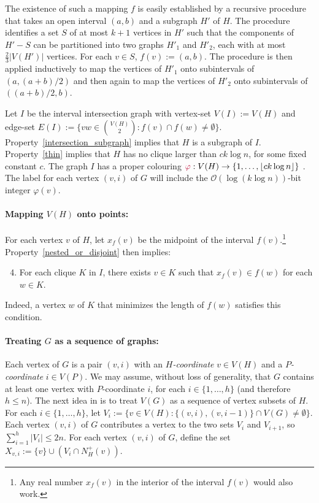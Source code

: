 \documentclass{patmorin}
\makeatletter
\renewcommand{\le}{\leqslant}
\newcommand{\defin}[1]{\emph{\textcolor{brightmaroon}{#1}}}
\def\mathcolor#1#{\@mathcolor{#1}}
\def\@mathcolor#1#2#3{%
  \protect\leavevmode
  \begingroup
    \color#1{#2}#3%
  \endgroup
}
\newcommand{\mathdefin}[1]{\mathcolor{brightmaroon}{#1}}
\newcommand{\Oh}{\mathcal{O}}
\makeatother
\begin{document}
  The existence of such a mapping $f$ is easily established by a recursive procedure that takes an open interval $(a,b)$ and a subgraph $H'$ of $H$.
  The procedure identifies a set $S$ of at most $k+1$ vertices in $H'$ such that the components of $H'-S$ can be partitioned into two graphs $H'_1$ and $H'_2$, each with at most $\tfrac{2}{3}|V(H')|$ vertices.
  For each $v\in S$, $f(v):=(a,b)$.  The procedure is then applied inductively to map the vertices of $H'_1$ onto subintervals of $(a,(a+b)/2)$ and then again to map the vertices of $H'_2$ onto subintervals of $((a+b)/2,b)$.

  Let $I$ be the interval intersection graph with vertex-set $V(I):=V(H)$ and edge-set $E(I):=\{vw\in\binom{V(H)}{2}:f(v)\cap f(w)\neq\emptyset\}$.
  Property~\ref{intersection_subgraph} implies that $H$ is a subgraph of $I$. Property~\ref{thin} implies that $H$ has no clique larger than $ck\log n$, for some fixed constant $c$.
  The graph $I$ has a proper colouring $\mathdefin{\varphi}:V(H)\to\{1,\ldots,\lfloor ck\log n\rfloor\}$ \cite{gilmore.hoffman:characterization}.
  The label for each vertex $(v,i)$ of $G$ will include the $\Oh(\log (k\log n))$-bit integer $\varphi(v)$.

  \paragraph{\boldmath Mapping $V(H)$ onto points:}
  For each vertex $v$ of $H$, let $x_f(v)$ be the midpoint of the interval $f(v)$.\footnote{Any real number $x_f(v)$ in the interior of the interval $f(v)$ would also work.}  Property~\ref{nested_or_disjoint} then implies:
  \begin{enumerate}[nosep,label=(I\arabic*)]\setcounter{enumi}{3}
      \item\label{clique_property} For each clique $K$ in $I$, there exists $v\in K$ such that $x_f(v)\in f(w)$ for each $w\in K$.
  \end{enumerate}
  Indeed, a vertex $w$ of $K$ that minimizes the length of $f(w)$ satisfies this condition.

  \paragraph{\boldmath Treating $G$ as a sequence of graphs:}
  Each vertex of $G$ is a pair $(v,i)$ with an \defin{$H$-coordinate} $v\in V(H)$ and a \defin{$P$-coordinate} $i\in V(P)$.
  We may assume, without loss of generality, that $G$ contains at least one vertex with $P$-coordinate $i$, for each $i\in\{1,\ldots,h\}$ (and therefore $h\le n$).
  The next idea in \cite{dujmovic.esperet.ea:adjacency} is to treat $V(G)$ as a sequence of vertex subsets of $H$.
  For each $i\in\{1,\ldots,h\}$, let $V_i:=\{v\in V(H): \{(v,i),(v,i-1)\}\cap V(G)\neq\emptyset \}$.    Each vertex $(v,i)$ of $G$ contributes a vertex to the two sets $V_{i}$ and $V_{i+1}$, so $\sum_{i=1}^h |V_i|\le 2n$.  For each vertex $(v,i)$ of $G$, define the set $X_{v,i}:= \{v\}\cup (V_i\cap N^+_H(v))$.
\end{document}

